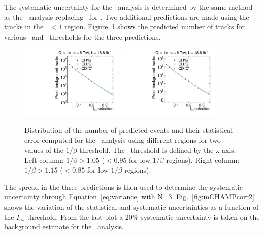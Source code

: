 The systematic uncertainty for the \multi\ analysis is determined by the same method as the \muononly\ analysis replacing \pt\ for \ias. 
Two additional predictions are made using the tracks in the \invbeta\ $< 1$ region.
Figure~\ref{fig:mCHAMPcorr} shows the predicted number of tracks for various \invbeta\ and \dedx\ thresholds for the three predictions.

\begin{figure}%
 \begin{center}
 \includegraphics[clip=true, trim=0.0cm 0cm 3.0cm 0cm,width=0.44\textwidth]{figures/multi/Data8TeVCollisionPrediction_TOF105}
 \includegraphics[clip=true, trim=0.0cm 0cm 3.0cm 0cm,width=0.44\textwidth]{figures/multi/Data8TeVCollisionPrediction_TOF115}
 \end{center}
 \caption[Distribution of the number of predicted events from different predictions in the \multi\ analysis]
{Distribution of the number of predicted events and their
   statistical error computed for the \multi\ analysis using
   different regions for two values of the $1/\beta$ threshold. The \ias\ threshold is defined by the x-axis.
Left column: $1/\beta>1.05$ ($<0.95$ for low $1/\beta$ regions). Right
column: $1/\beta>1.15$ ($<0.85$ for low $1/\beta$ regions).}
 \label{fig:mCHAMPcorr}
\end{figure}

The spread in the three predictions is then used to determine the systematic uncertainty through Equation~\ref{eq:variance} with N=3.
Fig.~\ref{fig:mCHAMPcorr2} shows the variation of the statistical and systematic uncertainties as a function of the $I_{as}$ threshold.
From the last plot a 20\% systematic uncertainty is taken on the background estimate for the \multi\ analysis.

